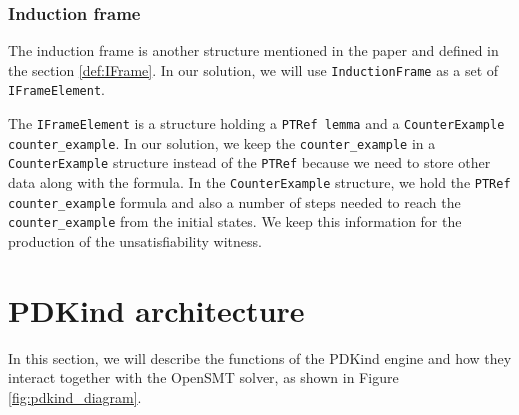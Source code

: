 \subsubsection{Induction frame}
\noindent The induction frame is another structure mentioned in the paper\cite{7886665} and defined in the section \ref{def:IFrame}. In our solution, we will use \texttt{InductionFrame} as a set of \texttt{IFrameElement}. 

The \texttt{IFrameElement} is a structure holding a \texttt{PTRef lemma} and a \texttt{CounterExample counter\_example}. In our solution, we keep the \texttt{counter\_example} in a \texttt{CounterExample} structure instead of the \texttt{PTRef} because we need to store other data along with the formula. In the \texttt{CounterExample} structure, we hold the \texttt{PTRef counter\_example} formula and also a number of steps needed to reach the \texttt{counter\_example} from the initial states. We keep this information for the production of the unsatisfiability witness.



\section{PDKind architecture}

\noindent In this section, we will describe the functions of the PDKind engine and how they interact together with the OpenSMT solver, as shown in Figure \ref{fig:pdkind_diagram}.



